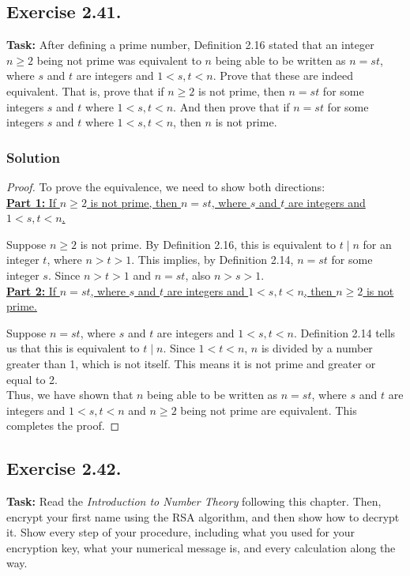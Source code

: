 \documentclass{article}
\begin{document}
\newpage

\subsection{Exercise 2.41.}
\textbf{Task:} After defining a prime number, Definition 2.16 stated that an integer $n \geq 2$ being not prime was equivalent to $n$ being able to be written as $n=st$, where $s$ and $t$ are integers and $1 < s,t < n$. Prove that these are indeed equivalent. That is, prove that if $n \geq 2$ is not prime, then $n=st$ for some integers $s$ and $t$ where $1 < s,t < n$. And then prove that if $n=st$ for some integers $s$ and $t$ where $1 < s,t < n$, then $n$ is not prime.


\subsubsection*{Solution}

\begin{proof}
    To prove the equivalence, we need to show both directions:\\

    \noindent \underline{\textbf{Part 1:} If $n \geq 2$ is not prime, then $n=st$, where $s$ and $t$ are integers and $1 < s,t < n$.}

    Suppose $n \geq 2$ is not prime. By Definition 2.16, this is equivalent to $t\mid n$ for an integer $t$, where $n > t > 1$. This implies, by Definition 2.14, $n=st$ for some integer $s$. Since $n > t > 1$ and $n=st$, also $n > s > 1$.\\

    \noindent \underline{\textbf{Part 2:} If $n=st$, where $s$ and $t$ are integers and $1 < s,t < n$, then $n \geq 2$ is not prime.}

    Suppose $n=st$, where $s$ and $t$ are integers and $1 < s,t < n$. Definition 2.14 tells us that this is equivalent to $t\mid n$. Since $1 < t < n$, $n$ is divided by a number greater than 1, which is not itself.  This means it is not prime and greater or equal to 2.\\
    
    Thus, we have shown that $n$ being able to be written as $n=st$, where $s$ and $t$ are integers and $1 < s,t < n$ and $n \geq 2$ being not prime are equivalent. This completes the proof.
\end{proof}

\newpage

\subsection{Exercise 2.42.}
\textbf{Task:} Read the \textit{Introduction to Number Theory} following this chapter. Then, encrypt your first name using the RSA algorithm, and then show how to decrypt it. Show every step of your procedure, including what you used for your encryption key, what your numerical message is, and every calculation along the way.
\end{document}
